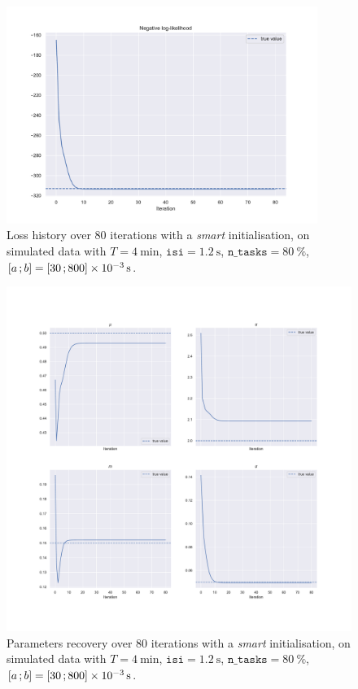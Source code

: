\begin{figure}[h!]
    \centering
    \includegraphics[width=0.9\textwidth]{pics/results/history_loss.pdf}
    \caption{Loss history over 80 iterations with a \textit{smart} initialisation, on simulated data with $T = \SI{4}{\minute}$, ${\texttt{isi}=\SI{1.2}{\second}}$, $\texttt{n\_tasks} = \SI{80}{\percent}$, $\left[ a \, ; b \right] = \left[ 30 \, ; 800 \right]\times \SI{e-3}{\second}$.}
    \label{fig:history_loss_1}
\end{figure}

\begin{figure}[h!]
    \centering
    \includegraphics[width=\textwidth]{pics/results/history_params.pdf}
    \caption{Parameters recovery over 80 iterations with a \textit{smart} initialisation, on simulated data with $T = \SI{4}{\minute}$, $\texttt{isi}=\SI{1.2}{\second}$, $\texttt{n\_tasks} = \SI{80}{\percent}$, $\left[ a \, ; b \right] = \left[ 30 \, ; 800 \right]\times \SI{e-3}{\second}$.}
    \label{fig:history_params_1}
\end{figure}

